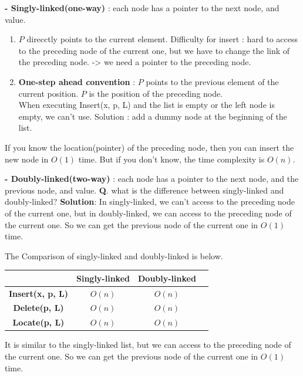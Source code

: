 \begin{section}
\noindent
\textbf{- Singly-linked(one-way)} : each node has a pointer to the next node, and value.

\begin{enumerate}
    \item $P$ direcctly points to the current element.
    Difficulty for insert : hard to access to the preceding node of the current one, but we have to change the link of the preceding node. -> we need a pointer to the preceding node.
    \item \textbf{One-step ahead convention} : $P$ points to the previous element of the current position. $P$ is the position of the preceding node. \\
    When executing Insert(x, p, L) and the list is empty or the left node is empty, we can't use. Solution : add a dummy node at the beginning of the list.
\end{enumerate}

If you know the location(pointer) of the preceding node, then you can insert the new node in $O(1)$ time. But if you don't know, the time complexity is $O(n)$.

\bigskip\noindent
\textbf{- Doubly-linked(two-way)} : each node has a pointer to the next node, and the previous node, and value.
\textbf{Q}. what is the difference between singly-linked and doubly-linked?
\textbf{Solution}: In singly-linked, we can't access to the preceding node of the current one, but in doubly-linked, we can access to the preceding node of the current one. So we can get the previous node of the current one in $O(1)$ time.

The Comparison of singly-linked and doubly-linked is below.
\begin{center}
\begin{tabular}{|c|c|c|c|}
    \hline
    & \textbf{Singly-linked} & \textbf{Doubly-linked} \\
    \hline
    \textbf{Insert(x, p, L)} & $O(n)$ & $O(n)$ \\
    \hline
    \textbf{Delete(p, L)} & $O(n)$ & $O(n)$ \\
    \hline
    \textbf{Locate(p, L)} & $O(n)$ & $O(n)$ \\
    \hline
\end{tabular}
\end{center}

It is similar to the singly-linked list, but we can access to the preceding node of the current one. So we can get the previous node of the current one in $O(1)$ time.


\end{section}
